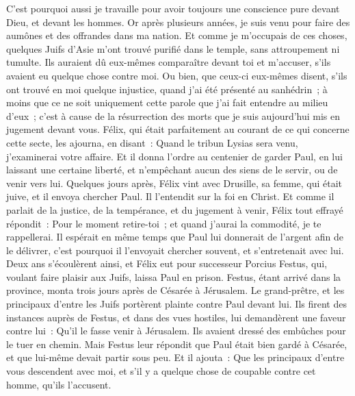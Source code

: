\begin{multicols}{2}
C'est pourquoi aussi je travaille pour avoir toujours une conscience pure devant Dieu, et devant les hommes.
Or après plusieurs années, je suis venu pour faire des aumônes et des offrandes dans ma nation.
Et comme je m'occupais de ces choses, quelques Juifs d'Asie m'ont trouvé purifié dans le temple, sans attroupement ni tumulte.
Ils auraient dû eux-mêmes comparaître devant toi et m'accuser, s'ils avaient eu quelque chose contre moi.
Ou bien, que ceux-ci eux-mêmes disent, s'ils ont trouvé en moi quelque injustice, quand j'ai été présenté au sanhédrin~;
à moins que ce ne soit uniquement cette parole que j'ai fait entendre au milieu d'eux~; c'est à cause de la résurrection des morts que je suis aujourd'hui mis en jugement devant vous.
Félix, qui était parfaitement au courant de ce qui concerne cette secte, les ajourna, en disant~: Quand le tribun Lysias sera venu, j'examinerai votre affaire.
Et il donna l'ordre au centenier de garder Paul, en lui laissant une certaine liberté, et n'empêchant aucun des siens de le servir, ou de venir vers lui.
Quelques jours après, Félix vint avec Drusille, sa femme, qui était juive, et il envoya chercher Paul. Il l'entendit sur la foi en Christ.
Et comme il parlait de la justice, de la tempérance, et du jugement à venir, Félix tout effrayé répondit~: Pour le moment retire-toi~; et quand j'aurai la commodité, je te rappellerai.
Il espérait en même temps que Paul lui donnerait de l'argent afin de le délivrer, c'est pourquoi il l'envoyait chercher souvent, et s'entretenait avec lui.
Deux ans s'écoulèrent ainsi, et Félix eut pour successeur Porcius Festus, qui, voulant faire plaisir aux Juifs, laissa Paul en prison.
\VerseOne{}Festus, étant arrivé dans la province, monta trois jours après de Césarée à Jérusalem.
Le grand-prêtre, et les principaux d'entre les Juifs portèrent plainte contre Paul devant lui. Ils firent des instances auprès de Festus, et dans des vues hostiles,
lui demandèrent une faveur contre lui~: Qu'il le fasse venir à Jérusalem. Ils avaient dressé des embûches pour le tuer en chemin.
Mais Festus leur répondit que Paul était bien gardé à Césarée, et que lui-même devait partir sous peu.
Et il ajouta~: Que les principaux d'entre vous descendent avec moi, et s'il y a quelque chose de coupable contre cet homme, qu'ils l'accusent.

\end{multicols}
